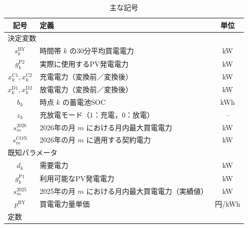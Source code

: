 \documentclass[a4paper,11pt,dvipdfmx]{jsarticle}
\begin{document}
\begin{table}[H]
    \centering
    \small
    \caption{主な記号}
    \label{tab:symbols}
    \begin{tabular}{c p{92mm} c}
        \toprule
        記号                                            & 定義                            & 単位     \\
        \midrule
        \multicolumn{3}{l}{決定変数}                                                               \\
        $s_k^{\mathrm{BY}}$                           & 時間帯 $k$ の30分平均買電電力            & kW     \\
        $g_k^{\mathrm{P2}}$                           & 実際に使用するPV発電電力                 & kW     \\
        $x_k^{\mathrm{C1}},x_k^{\mathrm{C2}}$         & 充電電力（変換前／変換後）                 & kW     \\
        $x_k^{\mathrm{D1}},x_k^{\mathrm{D2}}$         & 放電電力（変換前／変換後）                 & kW     \\
        $b_k$                                         & 時点 $k$ の蓄電池SOC                & kWh    \\
        $z_k$                                         & 充放電モード（$1$：充電，$0$：放電）         & --     \\
        $s_m^{2026}$                                  & 2026年の月 $m$ における月内最大買電電力      & kW     \\
        $s_m^{\mathrm{CON}}$                          & 2026年の月 $m$ に適用する契約電力         & kW     \\
        \midrule
        \multicolumn{3}{l}{既知パラメータ}                                                            \\
        $d_k$                                         & 需要電力                          & kW     \\
        $g_k^{\mathrm{P1}}$                           & 利用可能なPV発電電力                   & kW     \\
        $s_m^{2025}$                                  & 2025年の月 $m$ における月内最大買電電力（実績値） & kW     \\
        $p^{\mathrm{BY}}$                             & 買電電力量単価                       & 円/kWh  \\
        \midrule
        \multicolumn{3}{l}{定数}                                                                 \\

\end{tabular}
\end{table}
\end{document}
